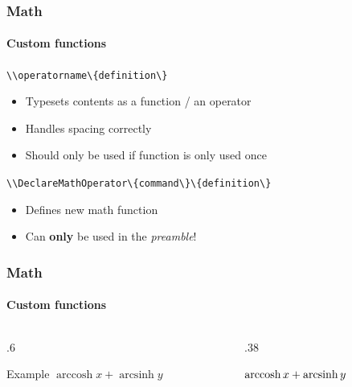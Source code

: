 \begin{frame}
    \frametitle{Math}
    \framesubtitle{Custom functions}
        {\Large\lstinline|\\operatorname\{definition\}|}
        
        \begin{itemize}
            \item<+-> Typesets contents as a function / an operator
            \item<+-> Handles spacing correctly
            \item<+-> Should only be used if function is only used once
        \end{itemize}
        \pause
        
        \vspace{1.5em}
        {\Large\lstinline|\\DeclareMathOperator\{command\}\{definition\}|}
        
        \begin{itemize}
            \item Defines new math function
            \item Can \textbf{only} be used in the \emph{preamble}!
        \end{itemize}
\end{frame}

\begin{frame}[fragile]
    \frametitle{Math}
    \framesubtitle{Custom functions}
    \begin{columns}
        \begin{column}{.6\textwidth}
            \begin{exlisting}{Example}
\DeclareMathOperator{\arcsinh}{arcsinh}
$\operatorname{arccosh}x + \arcsinh y$
            \end{exlisting}
        \end{column}
        \begin{column}{.38\textwidth}
            \centering
            \vspace{1em}

            $\operatorname{arccosh}x + \arcsinh y$
        \end{column}
    \end{columns}
\end{frame}